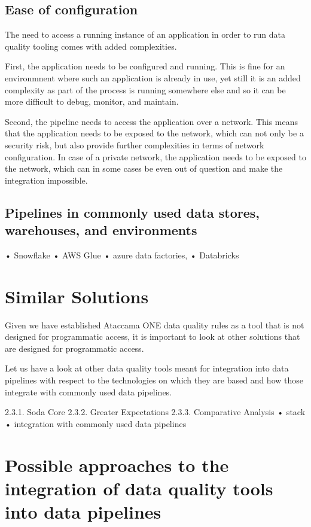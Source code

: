 \subsection{Ease of configuration}

The need to access a running instance of an application in order to run data quality tooling comes with added complexities.

First, the application needs to be configured and running. This is fine for an environmnent where such an application is already in use, yet still it is an added complexity as part of the process is running somewhere else and so it can be more difficult to debug, monitor, and maintain.

Second, the pipeline needs to access the application over a network. This means that the application needs to be exposed to the network, which can not only be a security risk, but also provide further complexities in terms of network configuration. In case of a private network, the application needs to be exposed to the network, which can in some cases be even out of question and make the integration impossible.

\subsection{Pipelines in commonly used data stores, warehouses, and environments}

• Snowflake
• AWS Glue
• azure data factories,
• Databricks

\section{Similar Solutions}

Given we have established Ataccama ONE data quality rules as a tool that is not designed for programmatic access, it is important to look at other solutions that are designed for programmatic access.

Let us have a look at other data quality tools meant for integration into data pipelines with respect to the technologies on which they are based and how those integrate with commonly used data pipelines.

2.3.1. Soda Core
2.3.2. Greater Expectations
2.3.3. Comparative Analysis
• stack
• integration with commonly used data pipelines

\section{Possible approaches to the integration of data quality tools into data pipelines}

